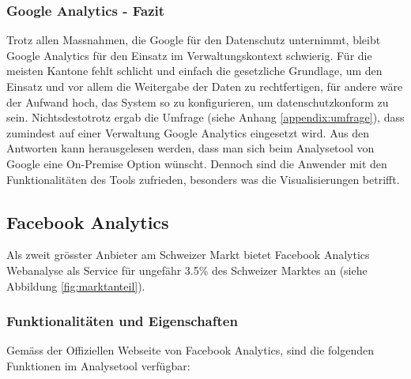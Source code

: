 \subsubsection{Google Analytics - Fazit}
Trotz allen Massnahmen, die Google für den Datenschutz unternimmt, bleibt Google Analytics für den Einsatz im Verwaltungskontext schwierig. Für die meisten Kantone fehlt schlicht und einfach die gesetzliche Grundlage, um den Einsatz und vor allem die Weitergabe der Daten zu rechtfertigen, für andere wäre der Aufwand hoch, das System so zu konfigurieren, um datenschutzkonform zu sein. Nichtsdestotrotz ergab die Umfrage (siehe Anhang \ref{appendix:umfrage}), dass zumindest auf einer Verwaltung Google Analytics eingesetzt wird. Aus den Antworten kann herausgelesen werden, dass man sich beim Analysetool von Google eine On-Premise Option wünscht. Dennoch sind die Anwender mit den Funktionalitäten des Tools zufrieden, besonders was die Visualisierungen betrifft.

\newpage

\subsection{Facebook Analytics} \label{subsec:FacebookAnalytics}

Als zweit grösster Anbieter am Schweizer Markt bietet Facebook Analytics Webanalyse als Service für ungefähr 3.5\% des Schweizer Marktes an (siehe Abbildung \ref{fig:marktanteil}).

\subsubsection{Funktionalitäten und Eigenschaften}
Gemäss der Offiziellen Webseite von Facebook Analytics, sind die folgenden Funktionen im Analysetool verfügbar:

